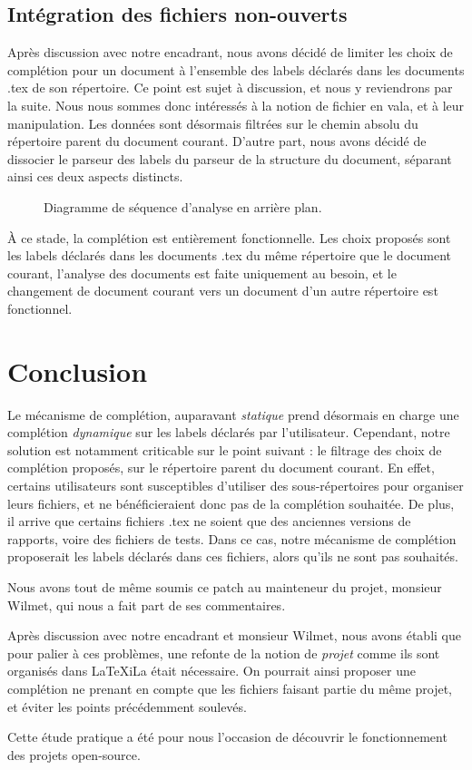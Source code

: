 \documentclass[a4paper,11pt]{report}
\begin{document}
\section{Intégration des fichiers non-ouverts}
Après discussion avec notre encadrant, nous avons décidé de limiter les choix de complétion pour un document à l'ensemble des labels déclarés dans les documents .tex de son répertoire.
Ce point est sujet à discussion, et nous y reviendrons par la suite.
Nous nous sommes donc intéressés à la notion de fichier en vala, et à leur manipulation.
Les données sont désormais filtrées sur le chemin absolu du répertoire parent du document courant.
D'autre part, nous avons décidé de dissocier le parseur des labels du parseur de la structure du document, séparant ainsi ces deux aspects distincts.

\begin{figure}[h]
\label{fig:multiple_doc_completion}
\centering

\caption{Diagramme de séquence d'analyse en arrière plan.}
\end{figure}

À ce stade, la complétion est entièrement fonctionnelle.
Les choix proposés sont les labels déclarés dans les documents .tex du même répertoire que le document courant, l'analyse des documents est faite uniquement au besoin, et le changement de document courant vers un document d'un autre répertoire est fonctionnel.

\chapter{Conclusion}
Le mécanisme de complétion, auparavant \textit{statique} prend désormais en charge une complétion \textit{dynamique} sur les labels déclarés par l'utilisateur.
Cependant, notre solution est notamment criticable sur le point suivant : le filtrage des choix de complétion proposés, sur le répertoire parent du document courant.
En effet, certains utilisateurs sont susceptibles d'utiliser des sous-répertoires pour organiser leurs fichiers, et ne bénéficieraient donc pas de la complétion souhaitée.
De plus, il arrive que certains fichiers .tex ne soient que des anciennes versions de rapports, voire des fichiers de tests. Dans ce cas, notre mécanisme de complétion proposerait les labels déclarés dans ces fichiers, alors qu'ils ne sont pas souhaités.

Nous avons tout de même soumis ce patch au mainteneur du projet, monsieur Wilmet, qui nous a fait part de ses commentaires.

Après discussion avec notre encadrant et monsieur Wilmet, nous avons établi que pour palier à ces problèmes, une refonte de la notion de \textit{projet} comme ils sont organisés dans LaTeXiLa était nécessaire.
On pourrait ainsi proposer une complétion ne prenant en compte que les fichiers faisant partie du même projet, et éviter les points précédemment soulevés.

Cette étude pratique a été pour nous l'occasion de découvrir le fonctionnement des projets open-source.
\end{document}
